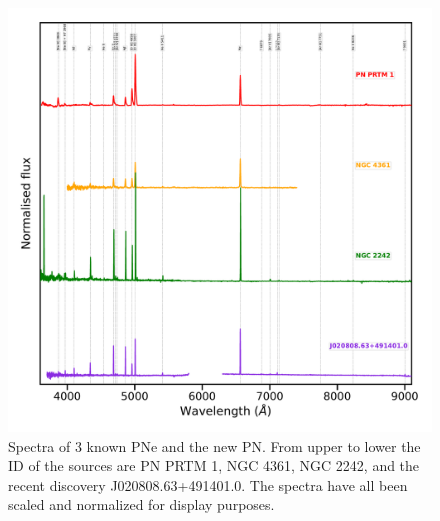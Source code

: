 \documentclass[fleqn,usenatbib]{mnras}
\begin{document}
\begin{figure}
\centering
\includegraphics[width=\linewidth]{Figs/spectra-compare.pdf}
\caption{Spectra of 3 known PNe and the new PN. From upper to lower the ID of the
  sources are PN PRTM 1, NGC 4361, NGC 2242, and the recent discovery
  J020808.63+491401.0. The spectra have all been scaled and normalized
  for display purposes.} 
  \label{fig:compare-spectra}
\end{figure}

\end{document}

